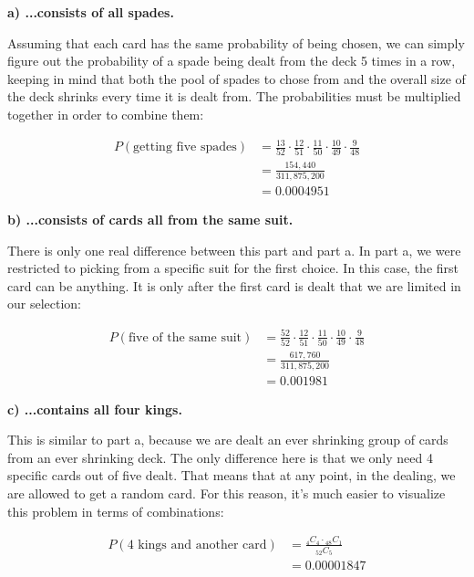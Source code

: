 \documentclass[12pt, letterpaper]{article}
\begin{document}
\qquad \textbf{a) ...consists of all spades.}
\begin{center}
	Assuming that each card has the same probability of being chosen, we can simply figure out the probability of a spade being dealt from the deck 5 times in a row, keeping in mind that both the pool of spades to chose from and the overall size of the deck shrinks every time it is dealt from. The probabilities must be multiplied together in order to combine them:
\end{center}
\begin{align*}
	P(\text{getting five spades}) &= \frac{13}{52} \cdot \frac{12}{51} \cdot \frac{11}{50} \cdot \frac{10}{49} \cdot \frac{9}{48} \\
	&= \frac{154,440}{311,875,200} \\
	&= \boxed{0.0004951}
\end{align*}

\qquad \textbf{b) ...consists of cards all from the same suit.}
\begin{center}
	There is only one real difference between this part and part a. In part a, we were restricted to picking from a specific suit for the first choice. In this case, the first card can be anything. It is only after the first card is dealt that we are limited in our selection:
\end{center}
\begin{align*}
	P(\text{five of the same suit}) &= \frac{52}{52} \cdot \frac{12}{51} \cdot \frac{11}{50} \cdot \frac{10}{49} \cdot \frac{9}{48} \\
	&= \frac{617,760}{311,875,200} \\
	&= \boxed{0.001981}
\end{align*}

\pagebreak

\qquad \textbf{c) ...contains all four kings.}
\begin{center}
	This is similar to part a, because we are dealt an ever shrinking group of cards from an ever shrinking deck. The only difference here is that we only need 4 specific cards out of five dealt. That means that at any point, in the dealing, we are allowed to get a random card. For this reason, it's much easier to visualize this problem in terms of combinations:
\end{center}
\begin{align*}
	P(\text{4 kings and another card}) &= \frac{{}_{4}C_{4} \cdot {{}_{48}C_{1}}}{{}_{52}C_{5}} \\
	&= \boxed{0.00001847}
\end{align*}
\end{document}
